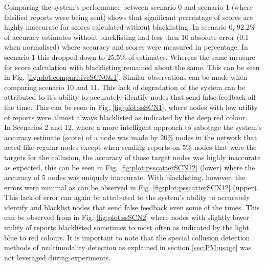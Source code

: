 \documentclass[journal]{IEEEtran}
\begin{document}
Comparing the system's performance between scenario 0 and scenario 1 (where falsified reports were being sent) shows that significant percentage of scores are highly inaccurate for scores calculated without blacklisting. In scenario 0, 92.2\% of accuracy estimates without blacklisting had less then 10 absolute error (0.1 when normalised) where accuracy and scores were measured in percentage. In scenario 1 this dropped down to 25.5\% of estimates. Whereas the same measure for score calculation with blacklisting remained about the same. This can be seen in Fig. \ref{fig:plot:comparitiveSCN0&1}. Similar observations can be made when comparing scenario 10 and 11. This lack of degradation of the system can be attributed to it's ability to accurately identify nodes that send false feedback all the time. This can be seen in Fig. \ref{fig:plot:ssSCN1}, where nodes with low utility of reports were almost always blacklisted as indicated by the deep red colour.\\
In Scenarios 2 and 12, where a more intelligent approach to sabotage the system's accuracy estimate (score) of a node was made by 20\% nodes in the network that acted like regular nodes except when sending reports on 5\% nodes that were the targets for the collusion, the accuracy of those target nodes was highly inaccurate as expected, this can be seen in Fig. \ref{fig:plot:psscatterSCN12} (lower) where the accuracy of 5 nodes was uniquely inaccurate. With blacklisting, however, the errors were minimal as can be observed in Fig. \ref{fig:plot:psscatterSCN12} (upper). This lack of error can again be attributed to the system's ability to accurately identify and blacklist nodes that send false feedback even some of the times. This can be observed from in Fig. \ref{fig:plot:ssSCN2} where nodes with slightly lower utility of reports blacklisted sometimes to most often as indicated by the light blue to red colours. It is important to note that the special collusion detection methods of multimodality detection\cite{c:DipTest}\cite{c:SilvermansTest} as explained in section \ref{sec:PM:usage} was not leveraged during experiments.
\end{document}

